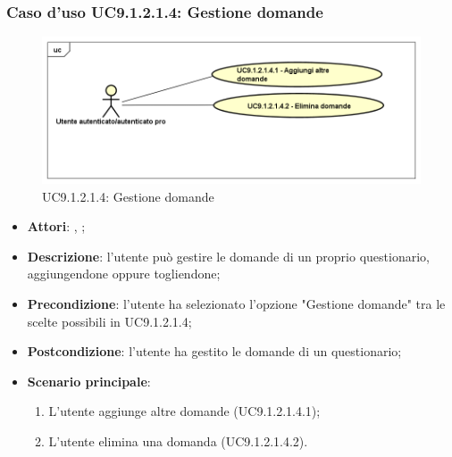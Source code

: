 					\subsubsection{Caso d'uso UC9.1.2.1.4: Gestione domande}
					\label{UC9.1.2.1.4}
					\begin{figure}[h]
						\centering
					\includegraphics[scale=0.5,keepaspectratio]{UML/UC9_1_2_1_4.png}
						\caption{UC9.1.2.1.4: Gestione domande}
					\end{figure}
					\FloatBarrier
					\begin{itemize}
						\item \textbf{Attori}: \uau, \uaupro;
						\item \textbf{Descrizione}: l'utente può gestire le domande di un proprio questionario, aggiungendone oppure togliendone;
						\item \textbf{Precondizione}: l'utente ha selezionato l'opzione "Gestione domande" tra le scelte possibili in UC9.1.2.1.4;
						\item \textbf{Postcondizione}: l'utente ha gestito le domande di un questionario;
						\item \textbf{Scenario principale}: 
							\begin{enumerate}
								\item L'utente aggiunge altre domande (UC9.1.2.1.4.1);
								\item L'utente elimina una domanda (UC9.1.2.1.4.2).
							\end{enumerate}
					\end{itemize}
					
